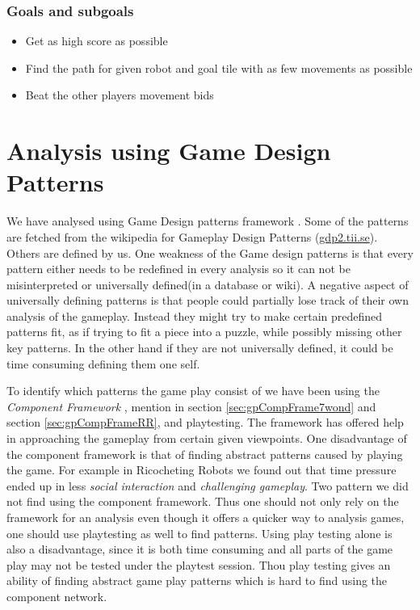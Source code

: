 \documentclass[a4paper]{article}
\begin{document}
\subsubsection{Goals and subgoals}
\begin{itemize}[noitemsep,topsep=0pt,parsep=0pt,partopsep=0pt]
  \item Get as high score as possible
  \item Find the path for given robot and goal tile with as few movements as possible
  \item Beat the other players movement bids
\end{itemize}

\section{Analysis using Game Design Patterns}
\label{sec:GDP}

We have analysed using Game Design patterns framework \cite{Bjork2003}.
Some of the patterns are fetched from the wikipedia for Gameplay Design Patterns (\url{gdp2.tii.se}).
Others are defined by us.
One weakness of the Game design patterns is that every pattern either needs to be redefined in every analysis so it can not be misinterpreted or universally defined(in a database or wiki).
A negative aspect of universally defining patterns is that people could partially lose track of their own analysis of the gameplay.
Instead they might try to make certain predefined patterns fit, as if trying to fit a piece into a puzzle, while possibly missing other key patterns.
In the other hand if they are not universally defined, it could be time consuming defining them one self. 

To identify which patterns the game play consist of we have been using the \textit{Component Framework} \cite{bjork2003describing}, mention in section \ref{sec:gpCompFrame7wond} and section \ref{sec:gpCompFrameRR}, and playtesting. 
The framework has offered help in approaching the gameplay from certain given viewpoints. 
One disadvantage of the component framework is that of finding abstract patterns caused by playing the game. For example in Ricocheting Robots we found out that time pressure ended up in less \textit{social interaction} and \textit{challenging gameplay}. 
Two pattern we did not find using the component framework. Thus one should not only rely on the framework for an analysis even though it offers a quicker way to analysis games, one should use playtesting as well to find patterns. 
Using play testing alone is also a disadvantage, since it is both time consuming and all parts of the game play may not be tested under the playtest session. 
Thou play testing gives an ability of finding abstract game play patterns which is hard to find using the component network.
\end{document}
